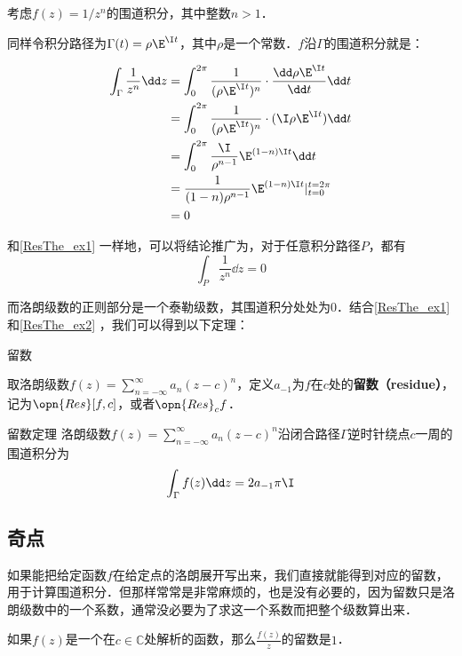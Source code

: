 \begin{example}{}\label{ResThe_ex2}
考虑$f(z)=1/z^n$的围道积分，其中整数$n>1$．

同样令积分路径为$\Gamma(t)=\rho\E^{\I t}$，其中$\rho$是一个常数．$f$沿$\Gamma$的围道积分就是：

\begin{equation}
\begin{aligned}
\int_{\Gamma}\frac{1}{z^n}\dd z&=\int^{2\pi}_0\frac{1}{(\rho\E^{\I t})^n}\cdot\frac{\dd\rho\E^{\I t}}{\dd t}\dd t\\
&=\int_0^{2\pi}\frac{1}{(\rho\E^{\I t})^n}\cdot (\I \rho \E^{\I t})\dd t\\
&=\int_0^{2\pi}\frac{\I}{\rho^{n-1}}\E^{(1-n)\I t}\dd t\\
&=\frac{1}{(1-n)\rho^{n-1}}\E^{(1-n)\I t}|^{t=2\pi}_{t=0}\\
&=0
\end{aligned}
\end{equation}

和\autoref{ResThe_ex1} 一样地，可以将结论推广为，对于任意积分路径$P$，都有
\begin{equation}
\int_P\frac{1}{z^n}\dd z=0
\end{equation}

\end{example}

而洛朗级数的正则部分是一个泰勒级数，其围道积分处处为$0$．结合\autoref{ResThe_ex1} 和\autoref{ResThe_ex2} ，我们可以得到以下定理：

\begin{definition}{留数}

取洛朗级数$f(z)=\sum\limits_{n=-\infty}^{\infty} a_n(z-c)^n$，定义$a_{-1}$为$f$在$c$处的\textbf{留数（residue）}，记为$\opn{Res}[f, c]$，或者$\opn{Res}_cf$．

\end{definition}

\begin{theorem}{留数定理}
洛朗级数$f(z)=\sum\limits_{n=-\infty}^{\infty} a_n(z-c)^n$沿闭合路径$\Gamma$逆时针绕点$c$一周的围道积分为
\begin{equation}
\int_\Gamma f(z)\dd z=2a_{-1}\pi\I
\end{equation}
\end{theorem}

\subsection{奇点}



如果能把给定函数$f$在给定点的洛朗展开写出来，我们直接就能得到对应的留数，用于计算围道积分．但那样常常是非常麻烦的，也是没有必要的，因为留数只是洛朗级数中的一个系数，通常没必要为了求这一个系数而把整个级数算出来．

\begin{lemma}{}
如果$f(z)$是一个在$c\in\mathbb{C}$处解析的函数，那么$\frac{f(z)}{z}$的留数是$1$．
\end{lemma}








